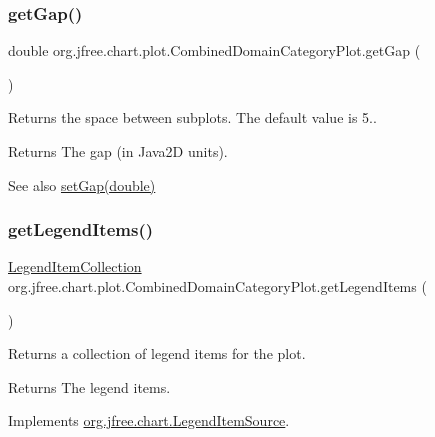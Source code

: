 \subsubsection{\texorpdfstring{get\+Gap()}{getGap()}}
{\footnotesize\ttfamily double org.\+jfree.\+chart.\+plot.\+Combined\+Domain\+Category\+Plot.\+get\+Gap (\begin{DoxyParamCaption}{ }\end{DoxyParamCaption})}

Returns the space between subplots. The default value is 5..

\begin{DoxyReturn}{Returns}
The gap (in Java2D units).
\end{DoxyReturn}
\begin{DoxySeeAlso}{See also}
\mbox{\hyperlink{classorg_1_1jfree_1_1chart_1_1plot_1_1_combined_domain_category_plot_a5d3f10078a53b2b557c02884c04b8615}{set\+Gap(double)}} 
\end{DoxySeeAlso}
\mbox{\label{classorg_1_1jfree_1_1chart_1_1plot_1_1_combined_domain_category_plot_ab1f03919631fb01fcc9c420ad61bfdb2}} 
\subsubsection{\texorpdfstring{get\+Legend\+Items()}{getLegendItems()}}
{\footnotesize\ttfamily \mbox{\hyperlink{classorg_1_1jfree_1_1chart_1_1_legend_item_collection}{Legend\+Item\+Collection}} org.\+jfree.\+chart.\+plot.\+Combined\+Domain\+Category\+Plot.\+get\+Legend\+Items (\begin{DoxyParamCaption}{ }\end{DoxyParamCaption})}

Returns a collection of legend items for the plot.

\begin{DoxyReturn}{Returns}
The legend items. 
\end{DoxyReturn}


Implements \mbox{\hyperlink{interfaceorg_1_1jfree_1_1chart_1_1_legend_item_source_a224409463c4f7a8ef0e2a9df337e6d3b}{org.\+jfree.\+chart.\+Legend\+Item\+Source}}.

